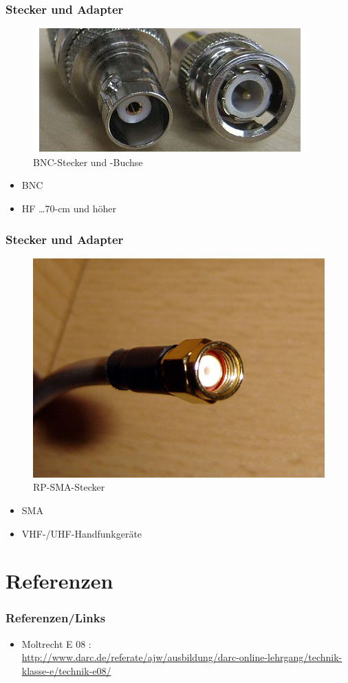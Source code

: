 \begin{frame}
\frametitle{Stecker und Adapter}
\begin{center}
  \begin{figure}
	\includegraphics[width=.6\textwidth,height=.7\textheight,keepaspectratio]{e10/bnc.jpg}
	\caption{BNC-Stecker und -Buchse\cite{bnc}}
      \end{figure}
	\begin{itemize}
		\item BNC
		\item HF \dots 70-cm und höher
	\end{itemize}	

\end{center}
\end{frame}

\begin{frame}
\frametitle{Stecker und Adapter}
\begin{center}
  \begin{figure}
	\includegraphics[width=.6\textwidth,height=.6\textheight,keepaspectratio]{e10/sma.jpg}
	\caption{RP-SMA-Stecker\cite{sma}}
      \end{figure}
	\begin{itemize}
		\item SMA
		\item VHF-/UHF-Handfunkgeräte
	\end{itemize}	 
\end{center}
\end{frame}

\section*{Referenzen}
\begin{frame}
    \frametitle{Referenzen/Links}
    
    \footnotesize
    \begin{itemize}
        \item Moltrecht E 08 : \\
              \url{http://www.darc.de/referate/ajw/ausbildung/darc-online-lehrgang/technik-klasse-e/technik-e08/}      
    \end{itemize}

\end{frame}

